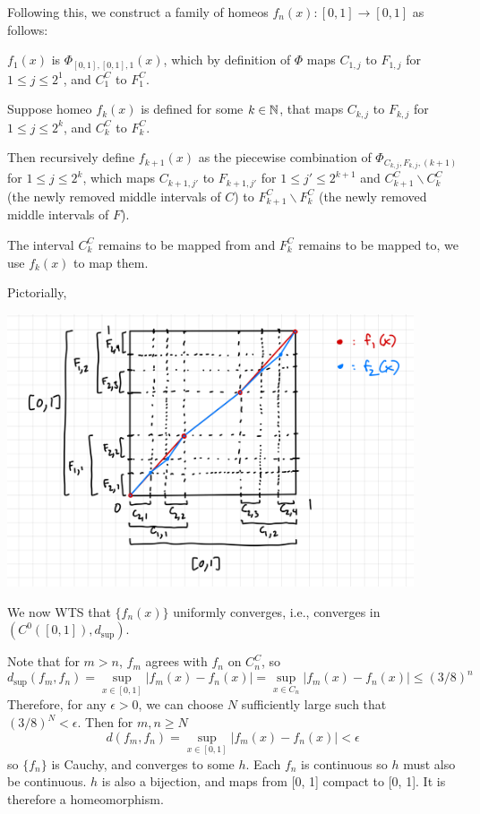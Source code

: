 \documentclass[a4paper, 12pt]{article}
\begin{document}
\begin{solution}
    Following this, we construct a family of homeos $f_n(x): [0, 1] \to [0,1]$ as follows:

    $f_1(x)$ is $\Phi_{[0, 1], [0,1], 1}(x)$, which by definition of $\Phi$ maps $C_{1, j}$ to $F_{1, j}$ for $1 \leq j \leq 2^1$, and $C_1^C$ to $F_1^C$.

    Suppose homeo $f_k(x)$ is defined for some $k \in \mathbb{N}$, that maps $C_{k, j}$ to $F_{k, j}$ for $1 \leq j \leq 2^k$, and $C_k^C$ to $F_k^C$.

    Then recursively define $f_{k+1}(x)$ as the piecewise combination of $\Phi_{C_{k, j}, F_{k, j}, (k+1)}$ for $1 \leq j \leq 2^k$, which maps $C_{k+1, j'}$ to $F_{k+1, j'}$ for $1 \leq j' \leq 2^{k+1}$ and $C_{k+1}^C \backslash C_k^C$ (the newly removed middle intervals of $C$) to $F_{k+1}^C \backslash F_k^C$ (the newly removed middle intervals of $F$).

    The interval $C_k^C$ remains to be mapped from and $F_k^C$ remains to be mapped to, we use $f_k(x)$ to map them.

    Pictorially, 
    \begin{center}
        \includegraphics[width = 12cm]{figures/3.33.jpeg}
    \end{center}

    We now WTS that $\{f_n(x)\}$ uniformly converges, i.e., converges in $(C^0([0, 1]), d_{\sup})$.

    Note that for $m > n$, $f_m$ agrees with $f_n$ on $C_n^C$, so \[
        d_{\sup}(f_m, f_n) = \sup_{x \in [0, 1]} |f_m(x) - f_n(x)| = \sup_{x \in C_n} |f_m(x) - f_n(x)| \leq (3/8)^n
    \]
    Therefore, for any $\epsilon > 0$, we can choose $N$ sufficiently large such that $(3/ 8)^N < \epsilon$. Then for $m, n \geq N $ \[
        d(f_m, f_n) = \sup_{x \in [0, 1]} |f_m(x) - f_n(x)| < \epsilon
    \]
    so $\{f_n\}$ is Cauchy, and converges to some $h$. Each $f_n$ is continuous so $h$ must also be continuous. $h$ is also a bijection, and maps from [0, 1] compact to [0, 1]. It is therefore a homeomorphism.


\end{solution}
\end{document}
